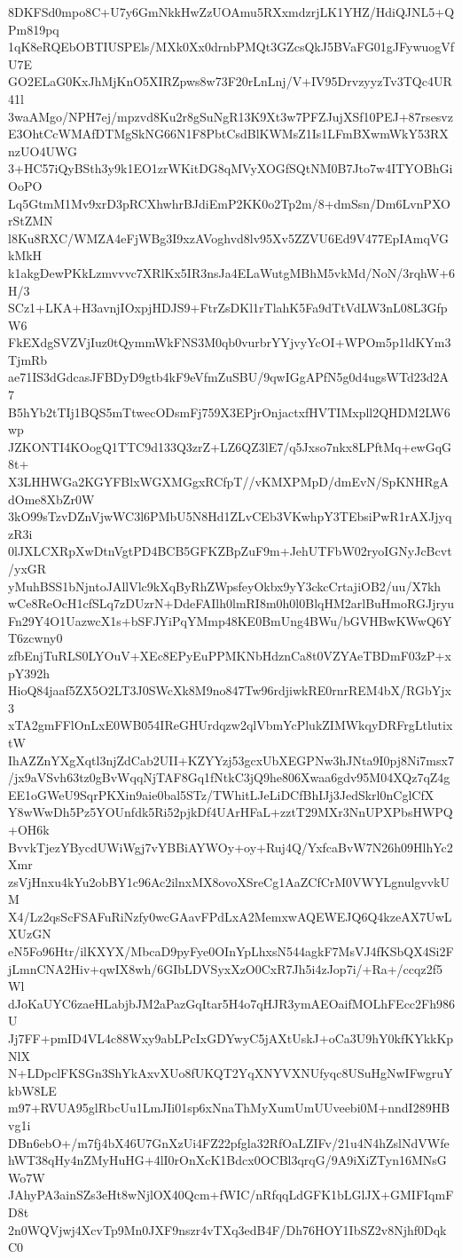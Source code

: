 8DKFSd0mpo8C+U7y6GmNkkHwZzUOAmu5RXxmdzrjLK1YHZ/HdiQJNL5+QPm819pq
1qK8eRQEbOBTIUSPEls/MXk0Xx0drnbPMQt3GZcsQkJ5BVaFG01gJFywuogVfU7E
GO2ELaG0KxJhMjKnO5XIRZpws8w73F20rLnLnj/V+IV95DrvzyyzTv3TQc4UR41l
3waAMgo/NPH7ej/mpzvd8Ku2r8gSuNgR13K9Xt3w7PFZJujXSf10PEJ+87rsesvz
E3OhtCcWMAfDTMgSkNG66N1F8PbtCsdBlKWMsZ1Is1LFmBXwmWkY53RXnzUO4UWG
3+HC57iQyBSth3y9k1EO1zrWKitDG8qMVyXOGfSQtNM0B7Jto7w4ITYOBhGiOoPO
Lq5GtmM1Mv9xrD3pRCXhwhrBJdiEmP2KK0o2Tp2m/8+dmSsn/Dm6LvnPXOrStZMN
l8Ku8RXC/WMZA4eFjWBg3I9xzAVoghvd8lv95Xv5ZZVU6Ed9V477EpIAmqVGkMkH
k1akgDewPKkLzmvvvc7XRlKx5IR3nsJa4ELaWutgMBhM5vkMd/NoN/3rqhW+6H/3
SCz1+LKA+H3avnjIOxpjHDJS9+FtrZsDKl1rTlahK5Fa9dTtVdLW3nL08L3GfpW6
FkEXdgSVZVjIuz0tQymmWkFNS3M0qb0vurbrYYjvyYcOI+WPOm5p1ldKYm3TjmRb
ae71IS3dGdcasJFBDyD9gtb4kF9eVfmZuSBU/9qwIGgAPfN5g0d4ugsWTd23d2A7
B5hYb2tTIj1BQS5mTtwecODsmFj759X3EPjrOnjactxfHVTIMxpll2QHDM2LW6wp
JZKONTI4KOogQ1TTC9d133Q3zrZ+LZ6QZ3lE7/q5Jxso7nkx8LPftMq+ewGqG8t+
X3LHHWGa2KGYFBlxWGXMGgxRCfpT//vKMXPMpD/dmEvN/SpKNHRgAdOme8XbZr0W
3kO99sTzvDZnVjwWC3l6PMbU5N8Hd1ZLvCEb3VKwhpY3TEbsiPwR1rAXJjyqzR3i
0lJXLCXRpXwDtnVgtPD4BCB5GFKZBpZuF9m+JehUTFbW02ryoIGNyJcBcvt/yxGR
yMuhBSS1bNjntoJAllVlc9kXqByRhZWpsfeyOkbx9yY3ckcCrtajiOB2/uu/X7kh
wCe8ReOcH1cfSLq7zDUzrN+DdeFAIlh0lmRI8m0h0l0BlqHM2arlBuHmoRGJjryu
Fn29Y4O1UazwcX1s+bSFJYiPqYMmp48KE0BmUng4BWu/bGVHBwKWwQ6YT6zcwny0
zfbEnjTuRLS0LYOuV+XEc8EPyEuPPMKNbHdznCa8t0VZYAeTBDmF03zP+xpY392h
HioQ84jaaf5ZX5O2LT3J0SWcXk8M9no847Tw96rdjiwkRE0rnrREM4bX/RGbYjx3
xTA2gmFFlOnLxE0WB054IReGHUrdqzw2qlVbmYcPlukZIMWkqyDRFrgLtlutixtW
IhAZZnYXgXqtl3njZdCab2UII+KZYYzj53gcxUbXEGPNw3hJNta9I0pj8Ni7msx7
/jx9aVSvh63tz0gBvWqqNjTAF8Gq1fNtkC3jQ9he806Xwaa6gdv95M04XQz7qZ4g
EE1oGWeU9SqrPKXin9aie0bal5STz/TWhitLJeLiDCfBhIJj3JedSkrl0nCglCfX
Y8wWwDh5Pz5YOUnfdk5Ri52pjkDf4UArHFaL+zztT29MXr3NnUPXPbsHWPQ+OH6k
BvvkTjezYBycdUWiWgj7vYBBiAYWOy+oy+Ruj4Q/YxfcaBvW7N26h09HlhYc2Xmr
zsVjHnxu4kYu2obBY1c96Ac2ilnxMX8ovoXSreCg1AaZCfCrM0VWYLgnulgvvkUM
X4/Lz2qsScFSAFuRiNzfy0wcGAavFPdLxA2MemxwAQEWEJQ6Q4kzeAX7UwLXUzGN
eN5Fo96Htr/ilKXYX/MbcaD9pyFye0OInYpLhxsN544agkF7MsVJ4fKSbQX4Si2F
jLmnCNA2Hiv+qwIX8wh/6GIbLDVSyxXzO0CxR7Jh5i4zJop7i/+Ra+/ccqz2f5Wl
dJoKaUYC6zaeHLabjbJM2aPazGqItar5H4o7qHJR3ymAEOaifMOLhFEcc2Fh986U
Jj7FF+pmID4VL4c88Wxy9abLPcIxGDYwyC5jAXtUskJ+oCa3U9hY0kfKYkkKpNlX
N+LDpclFKSGn3ShYkAxvXUo8fUKQT2YqXNYVXNUfyqc8USuHgNwIFwgruYkbW8LE
m97+RVUA95glRbcUu1LmJIi01sp6xNnaThMyXumUmUUveebi0M+nndI289HBvg1i
DBn6ebO+/m7fj4bX46U7GnXzUi4FZ22pfgla32RfOaLZIFv/21u4N4hZslNdVWfe
hWT38qHy4nZMyHuHG+4lI0rOnXcK1Bdcx0OCBl3qrqG/9A9iXiZTyn16MNsGWo7W
JAhyPA3ainSZs3eHt8wNjlOX40Qcm+fWIC/nRfqqLdGFK1bLGlJX+GMIFIqmFD8t
2n0WQVjwj4XcvTp9Mn0JXF9nszr4vTXq3edB4F/Dh76HOY1IbSZ2v8Njhf0DqkC0

